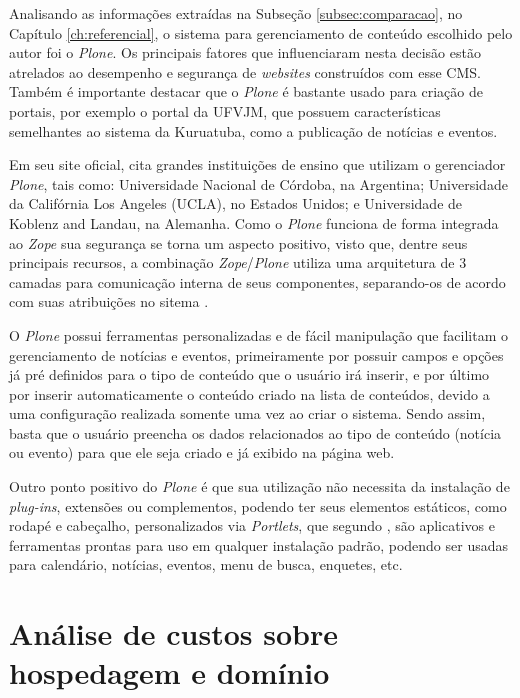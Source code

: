 \hspace{2.5cm}

Analisando as informações extraídas na Subseção \ref{subsec:comparacao}, no Capítulo \ref{ch:referencial}, o sistema para gerenciamento de conteúdo escolhido pelo autor foi o \textit{Plone}. Os principais fatores que influenciaram nesta decisão estão atrelados ao desempenho e segurança de \textit{websites} construídos com esse CMS. Também é importante destacar que o \textit{Plone} é bastante usado para criação de portais, por exemplo o portal da UFVJM, que possuem características semelhantes ao sistema da Kuruatuba, como a publicação de notícias e eventos. 

Em seu site oficial,  cita grandes instituições de ensino que utilizam o gerenciador \textit{Plone}, tais como: Universidade Nacional de Córdoba, na Argentina; Universidade da Califórnia Los Angeles (UCLA), no Estados Unidos; e Universidade de Koblenz and Landau, na Alemanha. Como o \textit{Plone} funciona de forma integrada ao \textit{Zope} sua segurança se torna um aspecto positivo, visto que, dentre seus principais recursos, a combinação \textit{Zope}/\textit{Plone} utiliza uma arquitetura de 3 camadas para comunicação interna de seus componentes, separando-os de acordo com suas atribuições no sitema \cite{pastore}. 

O \textit{Plone} possui ferramentas personalizadas e de fácil manipulação que facilitam o gerenciamento de notícias e eventos, primeiramente por possuir campos e opções já pré definidos para o tipo de conteúdo que o usuário irá inserir, e por último por inserir automaticamente o conteúdo criado na lista de conteúdos, devido a uma configuração realizada somente uma vez ao criar o sistema. Sendo assim, basta que o usuário preencha os dados relacionados ao tipo de conteúdo (notícia ou evento) para que ele seja criado e já exibido na página web.

Outro ponto positivo do \textit{Plone} é que sua utilização não necessita da instalação de \textit{plug-ins}, extensões ou complementos, podendo ter seus elementos estáticos, como rodapé e cabeçalho, personalizados via \textit{Portlets}, que segundo , são aplicativos e ferramentas prontas para uso em qualquer instalação padrão, podendo ser usadas para calendário, notícias, eventos, menu de busca, enquetes, etc. 

\hspace{2.5cm}
\section{Análise de custos sobre hospedagem e domínio}
\label{sec:hospedagem-dominio}
\hspace{2.5cm}

